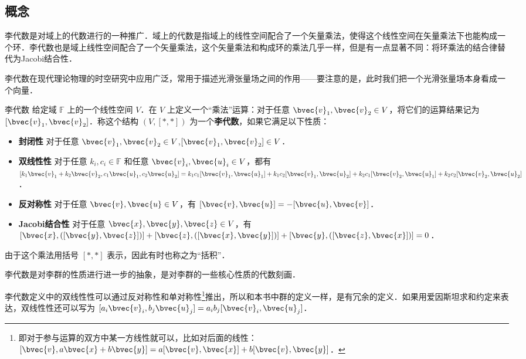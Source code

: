 
\subsection{概念}

李代数是对域上的代数进行的一种推广．域上的代数是指域上的线性空间配合了一个矢量乘法，使得这个线性空间在矢量乘法下也能构成一个环．李代数也是域上线性空间配合了一个矢量乘法，这个矢量乘法和构成环的乘法几乎一样，但是有一点显著不同：将环乘法的结合律替代为Jacobi结合性．

李代数在现代理论物理的时空研究中应用广泛，常用于描述光滑张量场之间的作用——要注意的是，此时我们把一个光滑张量场本身看成一个向量．

\begin{definition}{李代数}
给定域 $\mathbb{F}$ 上的一个线性空间 $V$．在 $V$ 上定义一个“乘法”运算：对于任意 $\bvec{v}_1, \bvec{v}_2\in V$，将它们的运算结果记为 $[\bvec{v}_1, \bvec{v}_2]$．称这个结构 $(V, [*, *])$ 为一个\textbf{李代数}，如果它满足以下性质：
\begin{itemize}
\item \textbf{封闭性} 对于任意 $\bvec{v}_1, \bvec{v}_2\in V$,$[\bvec{v}_1, \bvec{v}_2]\in V$．
\item \textbf{双线性性} 对于任意 $k_i, c_i\in \mathbb{F}$ 和任意 $\bvec{v}_i, \bvec{u}_i\in V$，都有 $[k_1\bvec{v}_1+k_2\bvec{v}_2, c_1\bvec{u}_1, c_2\bvec{u}_2]=k_1c_1[\bvec{v}_1, \bvec{u}_1]+k_1c_2[\bvec{v}_1, \bvec{u}_2]+k_2c_1[\bvec{v}_2, \bvec{u}_1]+k_2c_2[\bvec{v}_2, \bvec{u}_2]$．
\item \textbf{反对称性} 对于任意 $\bvec{v}, \bvec{u}\in V$，有 $[\bvec{v}, \bvec{u}]=-[\bvec{u}, \bvec{v}]$．
\item \textbf{Jacobi结合性} 对于任意 $\bvec{x}, \bvec{y}, \bvec{z}\in V$，有 $[\bvec{x}, ([\bvec{y}, \bvec{z}])]+[\bvec{z}, ([\bvec{x}, \bvec{y}])]+[\bvec{y}, ([\bvec{z}, \bvec{x}])]=0$．
\end{itemize}

由于这个乘法用括号 $[*, *]$ 表示，因此有时也称之为“括积”．
\end{definition}

李代数是对李群的性质进行进一步的抽象，是对李群的一些核心性质的代数刻画．

李代数定义中的双线性性可以通过反对称性和单对称性\footnote{即对于参与运算的双方中某一方线性就可以，比如对后面的线性：$[\bvec{v},a\bvec{x}+b\bvec{y}]=a[\bvec{v}, \bvec{x}]+b[\bvec{v}, \bvec{y}]$．}推出，所以和本书中群的定义一样，是有冗余的定义．如果用爱因斯坦求和约定来表达，双线性性还可以写为 $[a_i\bvec{v}_i, b_j\bvec{u}_j]=a_ib_j[\bvec{v}_i, \bvec{u}_j]$．

